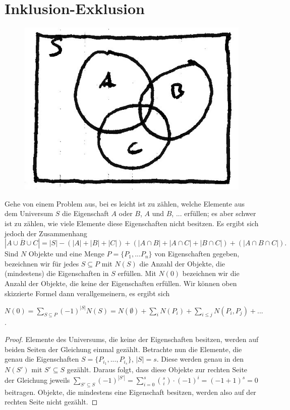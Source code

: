 \chapter{Inklusion-Exklusion}

  \begin{figure}[h]
    \centering
    \includegraphics[width=.25\textwidth]{./Bilder/b03.jpg}
  \end{figure}
  
  Gehe von einem Problem aus, bei es leicht ist zu zählen, welche Elemente aus dem Universum \(S\) die Eigenschaft \(A\) oder \(B\), \(A\) und \(B\), ... erfüllen; es aber schwer ist zu zählen, wie viele Elemente diese Eigenschaften nicht besitzen. Es ergibt sich jedoch der Zusammenhang
  \[
    | \overline{A \cup B \cup C} | = |S| - ( |A| + |B| + |C| ) + ( |A \cap B| + |A \cap C| + |B \cap C| ) + ( | A \cap B \cap C | ).
  \]
  Sind \(N\) Objekte und eine Menge \(P = \{ P_1, ... P_n \}\) von Eigenschaften gegeben, bezeichnen wir für jedes \(S \subseteq P\) mit \(N(S)\) die Anzahl der Objekte, die (mindestens) die Eigenschaften in \(S\) erfüllen. Mit \(N(0)\) bezeichnen wir die Anzahl der Objekte, die keine der Eigenschaften erfüllen. Wir können oben skizzierte Formel dann verallgemeinern, es ergibt sich
  
  \begin{theorem} \label{satzInklSumme}
    \(N(0) = \sum_{S \subseteq P} (-1)^{|S|} N(S) = N(\emptyset) + \sum_i N(P_i) + \sum_{i \leq j} N(P_i, P_j) + ...\).
  \end{theorem}
  
  \begin{proof}
    Elemente des Universums, die keine der Eigenschaften besitzen, werden auf beiden Seiten der Gleichung einmal gezählt. Betrachte nun die Elemente, die genau die Eigenschaften \(S = \{ P_{i_1}, ..., P_{i_s}\}\), \(|S| = s\). Diese werden genau in den \(N(S')\) mit \(S' \subseteq S\) gezählt. Daraus folgt, dass diese Objekte zur rechten Seite der Gleichung jeweils \( \sum_{S' \subseteq S} (-1)^{|S'|} = \sum_{i=0}^s \binom{s}{i} \cdot (-1)^i = (-1 + 1)^s = 0\) beitragen. Objekte, die mindestens eine Eigenschaft besitzen, werden also auf der rechten Seite nicht gezählt.
  \end{proof}
  
